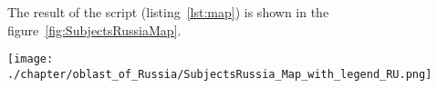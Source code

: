 The result of the script (listing~\ref{lst:map}) is shown in the figure~\ref{fig:SubjectsRussiaMap}.

\begin{figure*}[h]
	\texttt{[image: ./chapter/oblast\_of\_Russia/SubjectsRussia\_Map\_with\_legend\_RU.png]}
	\caption[Map of the population by subjects of Russia, 2021.]{Population map by subjects of Russia, 2021. The subjects are divided into six groups by population and marked with different colors depending on the group the subject belongs to. The map is based on the data received by the request~\protect\ref{lst:map}.}%
      \label{fig:SubjectsRussiaMap}%
\end{figure*} 


